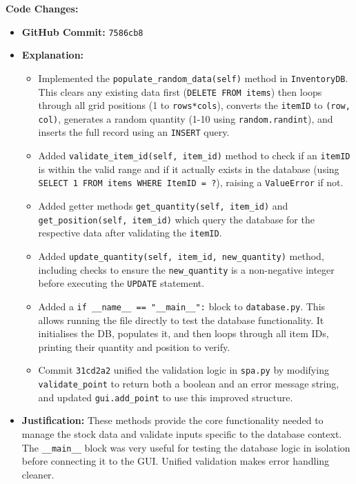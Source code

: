 \textbf{Code Changes:}
\begin{itemize}
	\item \textbf{GitHub Commit:} \verb|7586cb8|
	\item \textbf{Explanation:}
	\begin{itemize}
		\item Implemented the \verb|populate_random_data(self)| method in \verb|InventoryDB|. This clears any existing data first (\verb|DELETE FROM items|) then loops through all grid positions (1 to \verb|rows*cols|), converts the \verb|itemID| to \verb|(row, col)|, generates a random quantity (1-10 using \verb|random.randint|), and inserts the full record using an \verb|INSERT| query.
		\item Added \verb|validate_item_id(self, item_id)| method to check if an \verb|itemID| is within the valid range and if it actually exists in the database (using \verb|SELECT 1 FROM items WHERE ItemID = ?|), raising a \verb|ValueError| if not.
		\item Added getter methods \verb|get_quantity(self, item_id)| and \verb|get_position(self, item_id)| which query the database for the respective data after validating the \verb|itemID|.
		\item Added \verb|update_quantity(self, item_id, new_quantity)| method, including checks to ensure the \verb|new_quantity| is a non-negative integer before executing the \verb|UPDATE| statement.
		\item Added a \verb|if __name__ == "__main__":| block to \verb|database.py|. This allows running the file directly to test the database functionality. It initialises the DB, populates it, and then loops through all item IDs, printing their quantity and position to verify.
		\item Commit \verb|31cd2a2| unified the validation logic in \verb|spa.py| by modifying \verb|validate_point| to return both a boolean and an error message string, and updated \verb|gui.add_point| to use this improved structure.
	\end{itemize}
	\item \textbf{Justification:} These methods provide the core functionality needed to manage the stock data and validate inputs specific to the database context. The \verb|__main__| block was very useful for testing the database logic in isolation before connecting it to the GUI. Unified validation makes error handling cleaner.
\end{itemize}

